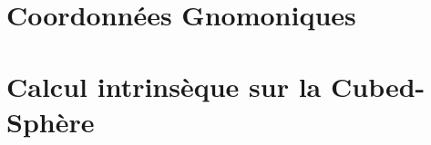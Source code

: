 \section{Coordonnées Gnomoniques}


















\section{Calcul intrinsèque sur la Cubed-Sphère}


















